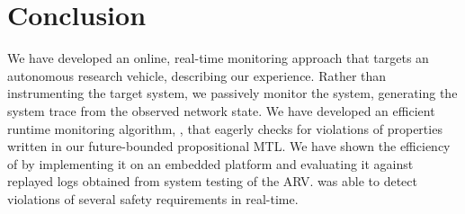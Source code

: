 
\section{Conclusion}
We have developed an online, real-time monitoring approach that targets an autonomous research vehicle, describing our experience. 
Rather than instrumenting the target system, we passively monitor the system, generating the system trace from the observed network state.
We have developed an efficient runtime monitoring algorithm, \monitor, that eagerly checks for violations of properties written in our future-bounded propositional MTL. We have shown the efficiency of \monitor by implementing it on an embedded platform and evaluating it against replayed logs obtained from system testing of the ARV. \monitor was able to detect violations of several safety requirements in real-time.
